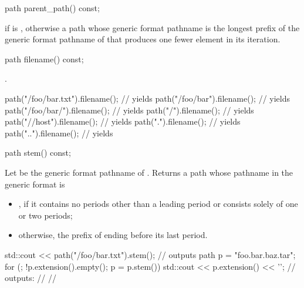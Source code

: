 %
\begin{itemdecl}
path parent_path() const;
\end{itemdecl}

\begin{itemdescr}
\pnum
\returns
{} if  is ,
otherwise a path whose generic format pathname is
the longest prefix of the generic format pathname of 
that produces one fewer element in its iteration.
\end{itemdescr}

%
\begin{itemdecl}
path filename() const;
\end{itemdecl}

\begin{itemdescr}
\pnum
\returns
{}.

\pnum
\begin{example}
\begin{codeblock}
path("/foo/bar.txt").filename();        // yields 
path("/foo/bar").filename();            // yields 
path("/foo/bar/").filename();           // yields 
path("/").filename();                   // yields 
path("//host").filename();              // yields 
path(".").filename();                   // yields 
path("..").filename();                  // yields 
\end{codeblock}
\end{example}
\end{itemdescr}

%
\begin{itemdecl}
path stem() const;
\end{itemdecl}

\begin{itemdescr}
\pnum
\returns
Let  be the generic format pathname of .
Returns a path whose pathname in the generic format is
\begin{itemize}
\item {}, if it contains no periods other than a leading period
or consists solely of one or two periods;
\item otherwise, the prefix of  ending before its last period.
\end{itemize}

\pnum
\begin{example}
\begin{codeblock}
std::cout << path("/foo/bar.txt").stem();       // outputs 
path p = "foo.bar.baz.tar";
for (; !p.extension().empty(); p = p.stem())
  std::cout << p.extension() << '\n';
  // outputs: 
  //          
  //          
\end{codeblock}
\end{example}
\end{itemdescr}

